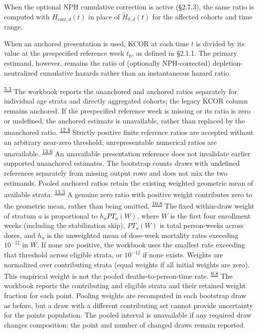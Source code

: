 \documentclass[
]{article}
\newcounter{none} %
\begin{document}
When the optional NPH cumulative correction is active (§2.7.3), the same ratio is computed with \(H_{\mathrm{corr},d}(t)\) in place of \(\tilde H_{0,d}(t)\) for the affected cohorts and time range.

When an anchored presentation is used, KCOR at each time \(t\) is divided by its value at the prespecified reference week \(t_0\), as defined in §2.1.1. The primary estimand, however, remains the ratio of (optionally NPH-corrected) depletion-neutralized cumulative hazards rather than an instantaneous hazard ratio.

\textsuperscript{\hyperlink{issue-5.3}{5.3}} {\color{red}The workbook reports the unanchored and anchored ratios separately for individual age strata and directly aggregated cohorts; the legacy KCOR column remains anchored. If the prespecified reference week is missing or its ratio is zero or undefined, the anchored estimate is unavailable, rather than replaced by the unanchored ratio. \textsuperscript{\hyperlink{issue-12.8}{12.8}} {\color{red} Strictly positive finite reference ratios are accepted without an arbitrary near-zero threshold; unrepresentable numerical ratios are unavailable. \textsuperscript{\hyperlink{issue-13.6}{13.6}} {\color{red} An unavailable presentation reference does not invalidate earlier supported unanchored estimates.}} The bootstrap counts draws with undefined references separately from missing output rows and does not mix the two estimands. Pooled anchored ratios retain the existing weighted geometric mean of available strata. \textsuperscript{\hyperlink{issue-13.3}{13.3}} {\color{red} A genuine zero ratio with positive weight contributes zero to the geometric mean, rather than being omitted.} \textsuperscript{\hyperlink{issue-10.8}{10.8}} {\color{red} The fixed within-draw weight of stratum \(a\) is proportional to \(h_a PT_a(W)\), where \(W\) is the first four enrollment weeks (including the stabilization skip), \(PT_a(W)\) is total person-weeks across doses, and \(h_a\) is the unweighted mean of dose-week mortality rates exceeding \(10^{-12}\) in \(W\). If none are positive, the workbook uses the smallest rate exceeding that threshold across eligible strata, or \(10^{-12}\) if none exists. Weights are normalized over contributing strata (equal weights if all initial weights are zero). This empirical weight is not the pooled deaths-to-person-time rate.} \textsuperscript{\hyperlink{issue-9.8}{9.8}} {\color{red} The workbook reports the contributing and eligible strata and their retained weight fraction for each point. Pooling weights are recomputed in each bootstrap draw as before, but a draw with a different contributing set cannot provide uncertainty for the point\textquotesingle{}s population. The pooled interval is unavailable if any required draw changes composition; the point and number of changed draws remain reported.}}
\end{document}

